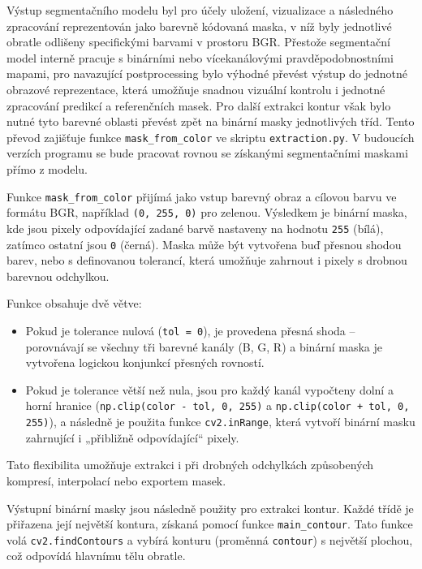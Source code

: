 \documentclass[male,czech,api_bc]{kitheses}
\begin{document}
Výstup segmentačního modelu byl pro účely uložení, vizualizace a následného zpracování reprezentován jako barevně kódovaná maska, v níž byly jednotlivé obratle odlišeny specifickými barvami v prostoru BGR. Přestože segmentační model interně pracuje s binárními nebo vícekanálovými pravděpodobnostními mapami, pro navazující postprocessing bylo výhodné převést výstup do jednotné obrazové reprezentace, která umožňuje snadnou vizuální kontrolu i jednotné zpracování predikcí a referenčních masek. Pro další extrakci kontur však bylo nutné tyto barevné oblasti převést zpět na binární masky jednotlivých tříd. Tento převod zajišťuje funkce \texttt{mask\_from\_color} ve skriptu \texttt{extraction.py}. V budoucích verzích programu se bude pracovat rovnou se získanými segmentačními maskami přímo z modelu.

Funkce \texttt{mask\_from\_color} přijímá jako vstup barevný obraz a cílovou barvu ve formátu BGR, například \texttt{(0, 255, 0)} pro zelenou. Výsledkem je binární maska, kde jsou pixely odpovídající zadané barvě nastaveny na hodnotu \texttt{255} (bílá), zatímco ostatní jsou \texttt{0} (černá). Maska může být vytvořena buď přesnou shodou barev, nebo s definovanou tolerancí, která umožňuje zahrnout i pixely s drobnou barevnou odchylkou.

Funkce obsahuje dvě větve:

\begin{itemize}
  \item Pokud je tolerance nulová (\texttt{tol = 0}), je provedena přesná shoda – porovnávají se všechny tři barevné kanály (B, G, R) a binární maska je vytvořena logickou konjunkcí přesných rovností.
  \item Pokud je tolerance větší než nula, jsou pro každý kanál vypočteny dolní a horní hranice (\texttt{np.clip(color - tol, 0, 255)} a \texttt{np.clip(color + tol, 0, 255)}), a následně je použita funkce \texttt{cv2.inRange}, která vytvoří binární masku zahrnující i „přibližně odpovídající“ pixely.
\end{itemize}

Tato flexibilita umožňuje extrakci i při drobných odchylkách způsobených kompresí, interpolací nebo exportem masek.

Výstupní binární masky jsou následně použity pro extrakci kontur. Každé třídě je přiřazena její největší kontura, získaná pomocí funkce \texttt{main\_contour}. Tato funkce volá \texttt{cv2.findContours} a vybírá konturu (proměnná \texttt{contour}) s největší plochou, což odpovídá hlavnímu tělu obratle.
\end{document}
